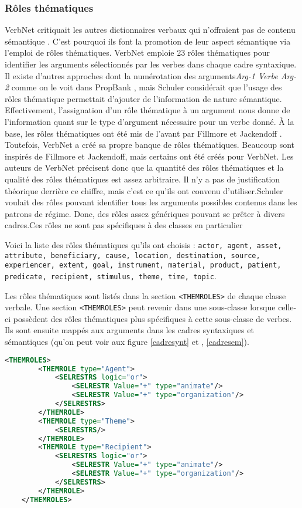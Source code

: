 \subsubsection{Rôles thématiques}
VerbNet critiquait les autres dictionnaires verbaux qui n'offraient pas de contenu sémantique \citep{SchulerVerbnetBroadcoverageComprehensive2005}. C'est pourquoi ils font la promotion de leur aspect sémantique via l'emploi de rôles thématiques. VerbNet emploie 23 rôles thématiques pour identifier les arguments sélectionnés par les verbes dans chaque cadre syntaxique. Il existe d'autres approches dont la numérotation des arguments\emph{Arg-1 Verbe Arg-2} comme on le voit dans PropBank \citep{PalmerPropositionBankAnnotated2005}, mais Schuler considérait que l'usage des rôles thématique permettait d'ajouter de l'information de nature sémantique. Effectivement, l'assignation d'un rôle thématique à un argument nous donne de l'information quant sur le type d'argument nécessaire pour un verbe donné. À la base, les rôles thématiques ont été mis de l'avant par Fillmore \cite{fillmore:case} et Jackendoff \cite{Jackendoff1972-JACSII-2}. Toutefois, VerbNet a créé sa propre banque de rôles thématiques. Beaucoup sont inspirés de Fillmore et Jackendoff, mais certains ont été créés pour VerbNet. Les auteurs de VerbNet précisent donc que la quantité des rôles thématiques et la qualité des rôles thématiques est assez arbitraire. Il n'y a pas de justification théorique derrière ce chiffre, mais c'est ce qu'ils ont convenu d'utiliser.Schuler voulait des rôles pouvant identifier tous les arguments possibles contenus dans les patrons de régime. Donc, des rôles assez génériques pouvant se prêter à divers cadres.Ces rôles ne sont pas spécifiques à des classes en particulier

Voici la liste des rôles thématiques qu'ils ont choisis : \texttt{actor, agent, asset, attribute, beneficiary, cause, location, destination, source, experiencer, extent, goal, instrument, material, product, patient, predicate, recipient, stimulus, theme, time, topic}.

Les rôles thématiques sont listés dans la section \lstinline|<THEMROLES>| de chaque classe verbale. Une section \lstinline|<THEMROLES>| peut revenir dans une sous-classe lorsque celle-ci possèdent des rôles thématiques plus spécifiques à cette sous-classe de verbes. Ils sont ensuite mappés aux arguments dans les cadres syntaxiques et sémantiques (qu'on peut voir aux figure \ref{cadresynt} et , \ref{cadresem}).

\begin{lstlisting}[language=XML, caption = Les rôles thématiques] % Majuscule aux captions
    <THEMROLES>
        <THEMROLE type="Agent">
            <SELRESTRS logic="or">
                <SELRESTR Value="+" type="animate"/>
                <SELRESTR Value="+" type="organization"/>
            </SELRESTRS>
        </THEMROLE>
        <THEMROLE type="Theme">
            <SELRESTRS/>
        </THEMROLE>
        <THEMROLE type="Recipient">
            <SELRESTRS logic="or">
                <SELRESTR Value="+" type="animate"/>
                <SELRESTR Value="+" type="organization"/>
            </SELRESTRS>
        </THEMROLE>
    </THEMROLES>
\end{lstlisting}

